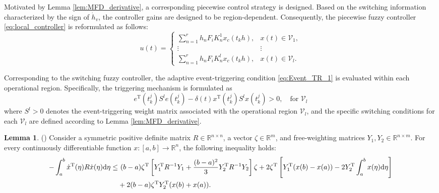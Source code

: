 \documentclass[preprint,review,fleqn,sort&compress,3p]{elsarticle}
\theoremstyle{definition} %
\theoremstyle{definition}%
\newtheorem{Lem}{Lemma}[section]
\begin{document}
Motivated by Lemma \ref{lem:MFD_derivative}, a corresponding piecewise control strategy is designed. Based on the switching information characterized by the sign of $\dot h_v$, the controller gains are designed to be region-dependent. Consequently, the piecewise fuzzy controller \eqref{eq:local_controller} is reformulated as follows:
\begin{equation} \label{eq:switching_controller}
	u(t) =
	\begin{cases}
		\sum_{n=1}^{r} h_n F_i K_{n}^1 x_c(t_k h), & x(t)\in \mathcal{V}_1, \\
		\vdots & \vdots \\
		\sum_{n=1}^{r} h_n F_i K_{n}^l x_c(t_k h), & x(t)\in \mathcal{V}_l.
	\end{cases}
\end{equation}

Corresponding to the switching fuzzy controller, the adaptive event-triggering condition \eqref{eq:Event_TR_1} is evaluated within each operational region. Specifically, the triggering mechanism is formulated as
\begin{equation} 
 e^{\mathrm{T}}(t^j_{k}) S^l e(t^j_{k}) - \delta(t) x^{\mathrm{T}}(t_{k}^j) S^l x(t_{k}^j) > 0, \quad \text{for } \mathcal{V}_l
\end{equation}
where $S^l>0$ denotes the event-triggering weight matrix associated with the operational region $\mathcal{V}_l$, and the specific switching conditions for each $\mathcal{V}_l$ are defined according to Lemma \ref{lem:MFD_derivative}.

\begin{Lem}\label{lem2}(\cite{guanModifiedLoopedFunctional2021a}) 
Consider a symmetric positive definite matrix $R \in \mathbb{R}^{n\times n}$, a vector $\zeta \in \mathbb{R}^{m}$, and free-weighting matrices $Y_1, Y_2 \in \mathbb{R}^{n\times m}$. For every continuously differentiable function $x : [a,b] \rightarrow \mathbb{R}^{n}$, the following inequality holds:
\begin{align}
	-\int_{a}^{b} \dot{x}^{\mathrm{T}}(\eta) R \dot{x}(\eta) \mathrm{d}\eta 
	\le & \ (b-a) \zeta^{\mathrm{T}} \left[ Y_1^{\mathrm{T}} R^{-1} Y_1 
	+ \frac{(b-a)^2}{3} Y_2^{\mathrm{T}} R^{-1} Y_2 \right] \zeta 
	 + 2\zeta^{\mathrm{T}} \left[ Y_1^{\mathrm{T}} (x(b) - x(a)) 
	 - 2Y_2^{\mathrm{T}} \int_{a}^{b} x(\eta)\mathrm{d}\eta \right] \notag \\
	& + 2(b-a) \zeta^{\mathrm{T}} Y_2^{\mathrm{T}} (x(b) + x(a)).
\end{align}
\end{Lem} 
\end{document}
